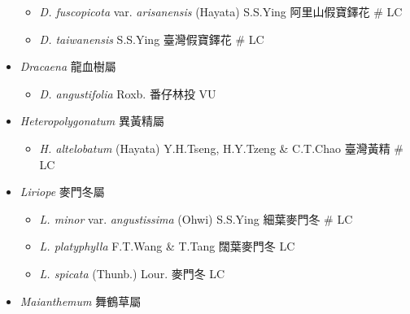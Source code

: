 \begin{itemize}
  \begin{itemize}
        \item[] \textit{D. fuscopicota} var. \textit{arisanensis} (Hayata) S.S.Ying  阿里山假寶鐸花  \# LC
        \item[] \textit{D. taiwanensis} S.S.Ying  臺灣假寶鐸花  \# LC
  \end{itemize}
 \item[] \textit{Dracaena} 龍血樹屬
                                
  \begin{itemize}
        \item[] \textit{D. angustifolia} Roxb.  番仔林投   VU
  \end{itemize}
 \item[] \textit{Heteropolygonatum} 異黃精屬
                                
  \begin{itemize}
        \item[] \textit{H. altelobatum} (Hayata) Y.H.Tseng, H.Y.Tzeng \& C.T.Chao  臺灣黃精  \# LC
  \end{itemize}
 \item[] \textit{Liriope} 麥門冬屬
                                
  \begin{itemize}
        \item[] \textit{L. minor} var. \textit{angustissima} (Ohwi) S.S.Ying  細葉麥門冬  \# LC
        \item[] \textit{L. platyphylla} F.T.Wang \& T.Tang  闊葉麥門冬   LC
        \item[] \textit{L. spicata} (Thunb.) Lour.  麥門冬   LC
  \end{itemize}
 \item[] \textit{Maianthemum} 舞鶴草屬
                                

\end{itemize}

